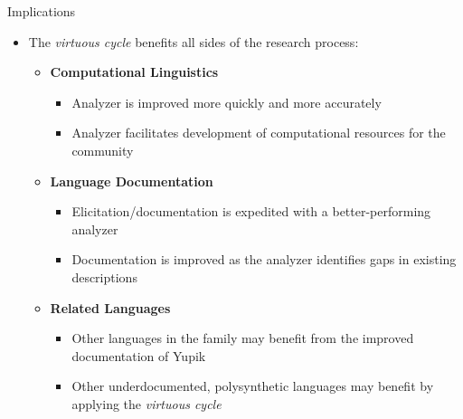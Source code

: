 \documentclass[usenames,dvipsnames]{beamer}
\begin{document}
\begin{frame}[fragile]
\begin{columns}[T]
\begin{column}{0.46\textwidth}
\begin{block}{Implications}
\begin{itemize}
    \item The \textit{virtuous cycle} benefits all sides of the research process:
        \vspace{18pt}
        \begin{itemize}
        \setlength\itemsep{18pt}
        
            \item \textbf{Computational Linguistics}
            \vspace{12pt}
            \begin{itemize}
            \setlength\itemsep{12pt}
                \item Analyzer is improved more quickly and more accurately
            
                \item Analyzer facilitates development of computational resources for the community
            \end{itemize}
        
             \item \textbf{Language Documentation}
            \vspace{12pt}
            \begin{itemize}
            \setlength\itemsep{12pt}
                \item Elicitation/documentation is expedited with a better-performing analyzer
            
                \item Documentation is improved as the analyzer identifies gaps in existing descriptions
            \end{itemize}
                
            \item \textbf{Related Languages}
            \vspace{12pt}
            \begin{itemize}
            \setlength\itemsep{18pt}
                \item Other languages in the family may benefit from the improved documentation of Yupik
                
                \item Other underdocumented, polysynthetic languages may benefit by applying the \textit{virtuous cycle}
            \end{itemize}
    \end{itemize}
\end{itemize}


\end{block}
\end{column}
\end{columns}
\end{frame}
\end{document}
